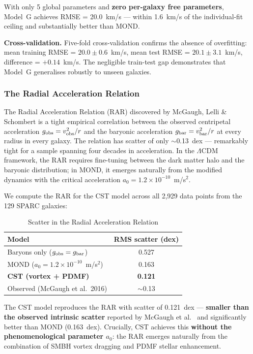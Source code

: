\documentclass[11pt,a4paper]{article}
\begin{document}
With only 5 global parameters and \textbf{zero per-galaxy free parameters}, Model~G achieves RMSE = 20.0~km/s --- within 1.6~km/s of the individual-fit ceiling and substantially better than MOND.

\textbf{Cross-validation.} Five-fold cross-validation confirms the absence of overfitting: mean training RMSE = $20.0 \pm 0.6$~km/s, mean test RMSE = $20.1 \pm 3.1$~km/s, difference = $+0.14$~km/s. The negligible train-test gap demonstrates that Model~G generalises robustly to unseen galaxies.

\subsubsection{The Radial Acceleration Relation}

The Radial Acceleration Relation (RAR) discovered by McGaugh, Lelli \& Schombert \cite{McGaugh2016} is a tight empirical correlation between the observed centripetal acceleration $g_{\rm obs} = v_{\rm obs}^2/r$ and the baryonic acceleration $g_{\rm bar} = v_{\rm bar}^2/r$ at every radius in every galaxy. The relation has scatter of only $\sim$0.13~dex --- remarkably tight for a sample spanning four decades in acceleration. In the $\Lambda$CDM framework, the RAR requires fine-tuning between the dark matter halo and the baryonic distribution; in MOND, it emerges naturally from the modified dynamics with the critical acceleration $a_0 = 1.2 \times 10^{-10}$~m/s$^2$.

We compute the RAR for the CST model across all 2{,}929 data points from the 129 SPARC galaxies:

\begin{table}[h]
\centering
\caption{Scatter in the Radial Acceleration Relation}
\begin{tabular}{lc}
\toprule
Model & RMS scatter (dex) \\
\midrule
Baryons only ($g_{\rm obs} = g_{\rm bar}$) & 0.527 \\
MOND ($a_0 = 1.2 \times 10^{-10}$~m/s$^2$) & 0.163 \\
\textbf{CST (vortex + PDMF)} & \textbf{0.121} \\
Observed (McGaugh et al.\ 2016) & $\sim$0.13 \\
\bottomrule
\end{tabular}
\end{table}

The CST model reproduces the RAR with scatter of 0.121~dex --- \textbf{smaller than the observed intrinsic scatter} reported by McGaugh et al.\ \cite{McGaugh2016} and significantly better than MOND (0.163~dex). Crucially, CST achieves this \textbf{without the phenomenological parameter $a_0$}: the RAR emerges naturally from the combination of SMBH vortex dragging and PDMF stellar enhancement.
\end{document}
